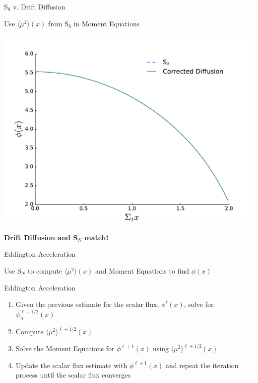 \documentclass[10pt]{beamer}
\newcommand{\SN}{S$_N$\xspace}
\newcommand{\edd}{\langle \mu^2 \rangle}
\begin{document}
\begin{frame}{S$_8$ v. Drift Diffusion}

    \onslide<+->
	Use $\edd(x)$ from S$_8$ in Moment Equations
	\begin{center}
	\includegraphics[width=.5\paperwidth]{figs/corrected.pdf}
	\end{center}

    \onslide<+->
	\centerline{\textbf{Drift Diffusion and \SN match!}}

\end{frame}

\begin{frame}{Eddington Acceleration}

    Use \SN to compute $\edd(x)$ and Moment Equations to find $\phi(x)$ 

    \begin{exampleblock}{Eddington Acceleration}
    \begin{enumerate}
        \item Given the previous estimate for the scalar flux, $\phi^{\ell}(x)$, solve for $\psi_n^{\ell+1/2}(x)$

        \item \alert{Compute $\edd^{\ell+1/2}(x)$ }

        \item \alert{Solve the Moment Equations for $\phi^{\ell+1}(x)$ 
        	using $\edd^{\ell+1/2}(x)$} 

        \item Update the scalar flux estimate with $\phi^{\ell+1}(x)$ and repeat the iteration process until the scalar flux converges
    \end{enumerate}
    \end{exampleblock}

\end{frame}
\end{document}
